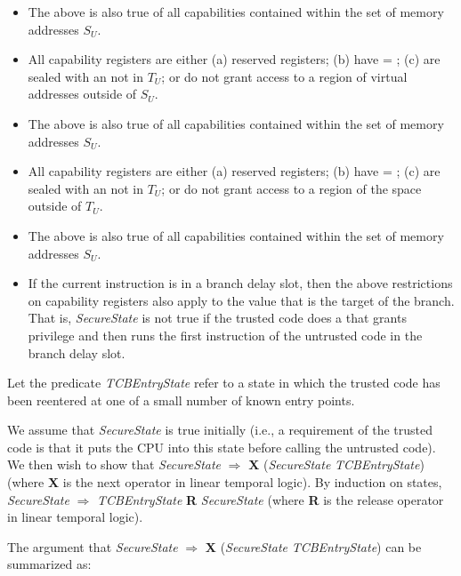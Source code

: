 \begin{itemize}
\item
The above is also true of all capabilities contained within the set of memory
addresses $S_U$.
\item
All capability registers are either (a) reserved registers; (b) have \ctag{} =
\algorithmicfalse{}; (c) are sealed with an \cotype{} not in $T_U$; or do not
grant access to a region of virtual addresses outside of $S_U$.
\item
The above is also true of all capabilities contained within the set of memory
addresses $S_U$.
\item
All capability registers are either (a) reserved registers; (b) have \ctag{} =
\algorithmicfalse{}; (c) are sealed with an \cotype{} not in $T_U$; or do not
grant access to a region of the \cotype{} space outside of $T_U$.
\item
The above is also true of all capabilities contained within the set of memory
addresses $S_U$.
\item
If the current instruction is in a branch delay slot, then the above restrictions
on capability registers also apply to the \PCC{} value that is the target of the
branch. That is, \emph{SecureState} is not true if the trusted code does a
 that grants privilege and then runs the first instruction of
the untrusted code in the branch delay slot.
\end{itemize}

Let the predicate \emph{TCBEntryState} refer to a state in which the trusted code
has been reentered at one of a small number of known entry points.

We assume that \emph{SecureState} is true initially (i.e.,
a requirement of
the trusted code is that it puts the CPU into this state before calling the
untrusted code). 
We then wish to show that \emph{SecureState} $\Rightarrow$ \textbf{X}
 (\emph{SecureState} \algorithmicor{} \emph{TCBEntryState}) (where \textbf{X} is
the next operator in linear temporal logic). By induction on states, 
\emph{SecureState} $\Rightarrow$ \emph{TCBEntryState} \textbf{R} \emph{SecureState}
(where \textbf{R} is the release operator in linear temporal logic).

The argument that \emph{SecureState} $\Rightarrow$ \textbf{X} (\emph{SecureState}
\algorithmicor{} \emph{TCBEntryState}) can be summarized as:


